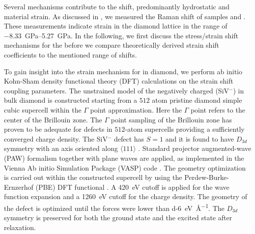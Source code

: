 	
	Several mechanisms contribute to the \cwl shift, pre\-dominantly hydro\-static and material strain.
	As discussed in , we measured the Raman shift of samples \insituS and \implantedTao.
	These measurements indicate strain in the diamond lattice in the range of \SIrange{-8.33}{5.27}{\giga\pascal}.
	In the following, we first discuss the stress/strain shift mechanisms for the \siv before we compare theoretically derived strain shift coefficients to the mentioned range of \ZPL shifts.

	To gain insight into the strain mechanism for \sivs in diamond, we perform ab initio Kohn-Sham density functional theory (DFT) calculations on the strain \ZPL shift coupling parameters. 
	The unstrained model of the negatively charged \sivc (SiV$^{-}$) in bulk diamond is constructed starting from a $512$ atom pristine diamond simple cubic supercell within the $\Gamma$ point approximation. Here the $\Gamma$ point refers to the center of the Brillouin zone.
	The $\Gamma$ point sampling of the Brillouin zone has proven to be adequate for defects in $512$-atom supercells \cite{deak2014formation,kaviani2014proper} providing a sufficiently converged charge density. 
	The SiV$^{-}$ defect has $S=1$ and it is found to have $D_{3d}$ symmetry with an axis oriented along  $\langle 111 \rangle$ \cite{Goss2007}. 
	Standard projector augmented-wave (PAW) formalism together with plane waves are applied, as implemented in the Vienna Ab initio Simulation Package (VASP) code \cite{kresse1993ab,kresse1996efficiency,kresse1996efficient,kresse1999ultrasoft}. The geometry optimization is carried out within the constructed supercell by using the Perdew-Burke-Ernzerhof (PBE) DFT functional \cite{perdew1996generalized}. A \SI{420}{\eV} cutoff is applied for the wave function expansion and a \SI{1260}{\eV} cutoff for the charge density. The geometry of the defect is optimized until the forces were lower than \SI{d-6}{\eV\per\angstrom}. The $D_{3d}$ symmetry is preserved for both the ground state and the excited state after relaxation.


